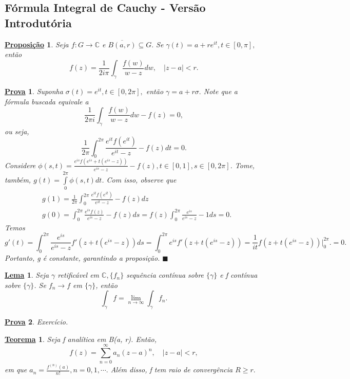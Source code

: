 \documentclass{article}
\newtheorem*{theorem*}{\underline{Teorema}}
\newtheorem*{proof*}{\underline{Prova}}
\newtheorem*{prop*}{\underline{Proposi\c c\~ao}}
\newtheorem*{lmm*}{\underline{Lema}}
\renewcommand\qedsymbol{$\blacksquare$}
\begin{document}
  \subsection{F\'ormula Integral de Cauchy - Vers\~ao Introdut\'oria}
  \begin{prop*}
    Seja $f:G\rightarrow \mathbb{C}$ e $\overline{B(a, r)}\subseteq{G}.$ Se $\gamma(t) = a + r e^{it}, t\in[0, \pi],$ ent\~ao
    $$
    f(z) = \frac{1}{2i\pi}\int_{\gamma}^{}\frac{f(w)}{w-z}dw, \quad |z-a| < r.
    $$
  \end{prop*}
  \begin{proof*}
    Suponha $\sigma(t) = e^{it}, t\in[0, 2\pi],$ ent\~ao $\gamma = a + r\sigma.$ Note que a f\'ormula buscada equivale a 
    $$
    \frac{1}{2\pi i}\int_{\gamma}^{}\frac{f(w)}{w-z}dw - f(z) = 0,
    $$
    ou seja,
    $$
    \frac{1}{2\pi}\int_{0}^{2\pi}\frac{e^{it}f(e^{it})}{e^{it}-z} - f(z) dt = 0.
    $$
    Considere $\phi(s, t) = \frac{e^{is}f(e^{is}+t(e^{is}-z))}{e^{is}-z} - f(z), t\in[0, 1], s\in[0, 2\pi]$. Tome, tamb\'em,
    $g(t) = \int\limits_{0}^{2\pi}\phi(s, t)dt$. Com isso, observe que 
    \begin{align*}
  &g(1) = \frac{1}{2\pi}\int_{0}^{2\pi}\frac{e^{it}f(e^{it})}{e^{it}-z} - f(z)dz \\
  &g(0) = \int_{0}^{2\pi}\frac{e^{is}f(z)}{e^{is}-z} - f(z) ds = f(z)\int_{0}^{2\pi}\frac{e^{is}}{e^{is}-z} - 1ds = 0.
    \end{align*}
    Temos 
    $$
    g'(t) = \int_{0}^{2\pi}\frac{e^{is}}{e^{is}-z}f'(z + t(e^{is}-z))ds = \int_{0}^{2\pi}e^{is}f'(z + t(e^{is}-z)) = 
    \frac{1}{it}f(z + t(e^{is}-z)) \biggl|_{0}^{2\pi}\biggr. = 0.
    $$
    Portanto, g \'e constante, garantindo a proposi\c c\~ao. \qedsymbol
  \end{proof*}
  \begin{lmm*}
    Seja $\gamma$ retific\'avel em $\mathbb{C},\{f_{n}\} $ sequ\^encia cont\'inua sobre $\{\gamma\} $ e f cont\'inua sobre
    $\{\gamma\}$. Se $f_{n}\to{f}$ em $\{\gamma\}$, ent\~ao
    $$
    \int_{\gamma}^{}f = \lim_{n\to\infty}\int_{\gamma}^{}f_{n}.
    $$
  \end{lmm*} 
  \begin{proof*}
    Exerc\'icio.
  \end{proof*}
  \begin{theorem*}
    Seja f anal\'itica em B(a, r). Ent\~ao, 
    $$
    f(z) = \sum\limits_{n=0}^{\infty}a_{n}(z-a)^{n}, \quad |z-a| < r,
    $$
    em que $a_{n} = \frac{f^{(n)}(a)}{n!}, n = 0, 1, \cdots.$ Al\'em disso, f tem raio de converg\^encia $R\geq{r}.$
  \end{theorem*}
\end{document}
